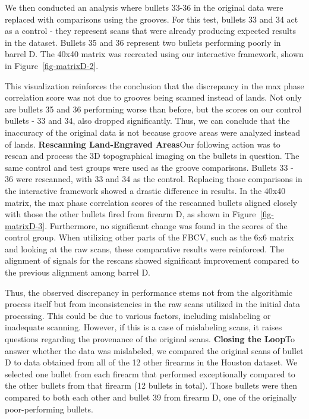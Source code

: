 \documentclass[
  12pt]{article}
\begin{document}
We then conducted an analysis where bullets 33-36 in the original data
were replaced with comparisons using the grooves. For this test, bullets
33 and 34 act as a control - they represent scans that were already
producing expected results in the dataset. Bullets 35 and 36 represent
two bullets performing poorly in barrel D. The 40x40 matrix was
recreated using our interactive framework, shown in
Figure~\ref{fig-matrixD-2}.

This visualization reinforces the conclusion that the discrepancy in the
max phase correlation score was not due to grooves being scanned instead
of lands. Not only are bullets 35 and 36 performing worse than before,
but the scores on our control bullets - 33 and 34, also dropped
significantly. Thus, we can conclude that the inaccuracy of the original
data is not because groove areas were analyzed instead of lands.
\hfill\newline\noindent \textbf{Rescanning Land-Engraved
Areas}\hfill\newline Our following action was to rescan and process the
3D topographical imaging on the bullets in question. The same control
and test groups were used as the groove comparisons. Bullets 33 - 36
were rescanned, with 33 and 34 as the control. Replacing those
comparisons in the interactive framework showed a drastic difference in
results. In the 40x40 matrix, the max phase correlation scores of the
rescanned bullets aligned closely with those the other bullets fired
from firearm D, as shown in Figure~\ref{fig-matrixD-3}. Furthermore, no
significant change was found in the scores of the control group. When
utilizing other parts of the FBCV, such as the 6x6 matrix and looking at
the raw scans, these comparative results were reinforced. The alignment
of signals for the rescans showed significant improvement compared to
the previous alignment among barrel D.

Thus, the observed discrepancy in performance stems not from the
algorithmic process itself but from inconsistencies in the raw scans
utilized in the initial data processing. This could be due to various
factors, including mislabeling or inadequate scanning. However, if this
is a case of mislabeling scans, it raises questions regarding the
provenance of the original scans. \hfill\newline\noindent
\textbf{Closing the Loop}\hfill\newline To answer whether the data was
mislabeled, we compared the original scans of bullet D to data obtained
from all of the 12 other firearms in the Houston dataset. We selected
one bullet from each firearm that performed exceptionally compared to
the other bullets from that firearm (12 bullets in total). Those bullets
were then compared to both each other and bullet 39 from firearm D, one
of the originally poor-performing bullets.
\end{document}
